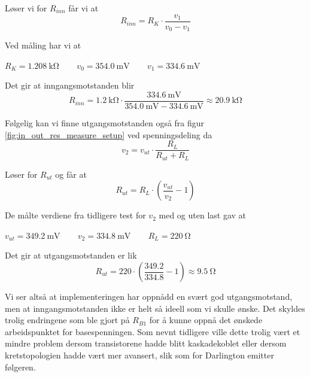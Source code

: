 Løser vi for $R_{inn}$ får vi at 
\[
    R_{inn} = R_K \cdot \frac{v_1}{v_0 - v_1}
\]

Ved måling har vi at
\begin{center}
    $R_K = \SI{1.208}{\kilo\ohm}\:\:\:\:$ $\:\:\:\:v_0 = \SI{354.0}{\milli\volt}\:\:\:\:$ $\:\:\:\:v_1 = \SI{334.6}{\milli\volt}$
\end{center}

Det gir at inngangsmotstanden blir
\[
    R_{inn} = \SI{1.2}{\kilo\ohm} \cdot \frac{\SI{334.6}{\milli\volt}}{\SI{354.0}{\milli\volt} - \SI{334.6}{\milli\volt}} \approx \SI{20.9}{\kilo\ohm}
\]

Følgelig kan vi finne utgangsmotstanden også fra figur \ref{fig:in_out_res_measure_setup} ved spenningsdeling 
da 
\[
    v_2 = v_{ut} \cdot \frac{R_L}{R_{ut} + R_L}
\]

Løser for $R_{ut}$ og får at 
\[
    R_{ut} = R_L \cdot \left(\frac{v_{ut}}{v_2} - 1\right)
\]

De målte verdiene fra tidligere test for $v_2$ med og uten last gav at 
\begin{center}
    $v_{ut} = \SI{349.2}{\milli\volt}\:\:\:\:$ $\:\:\:\:v_{2} = \SI{334.8}{\milli\volt}\:\:\:\:$ $\:\:\:\:R_L = \SI{220}{\ohm}$
\end{center}

Det gir at utgangsmotstanden er lik 
\[
    R_{ut} = 220 \cdot \left(\frac{349.2}{334.8} - 1\right) \approx \SI{9.5}{\ohm}
\]

Vi ser altså at implementeringen har oppnådd en svært god utgangsmotstand, men at inngangsmotstanden 
ikke er helt så ideell som vi skulle ønske. Det skyldes trolig endringene som ble gjort på $R_{B1}$ 
for å kunne oppnå det ønskede arbeidspunktet for basespenningen. Som nevnt tidligere 
ville dette trolig vært et mindre problem dersom transistorene hadde blitt kaskadekoblet eller dersom 
kretstopologien hadde vært mer avansert, slik som for Darlington emitter følgeren.
